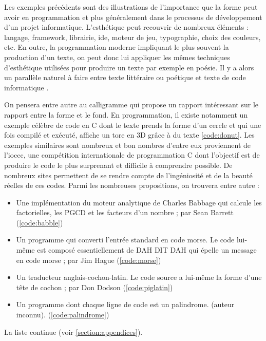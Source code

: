 \documentclass[12pt]{article} %
\begin{document}
Les exemples précédents sont des illustrations de l'importance que la forme peut avoir en programmation et plus généralement dans le processus de développement d'un projet informatique. L'esthétique peut recouvrir de nombreux éléments : langage, framework, librairie, \acrshort{ide}, moteur de jeu, typographie, choix des couleurs, etc. En outre, la programmation moderne impliquant le plus souvent la production d'un texte, on peut donc lui appliquer les mêmes techniques d'esthétique utilisées pour produire un texte par exemple en poésie. Il y a alors un parallèle naturel à faire entre texte littéraire ou poétique et texte de code informatique \cite{FCramer2001}.

On pensera entre autre au \gls{calligramme} qui propose un rapport intéressant sur le rapport entre la forme et le fond. En programmation, il existe notamment un exemple célèbre de code en C dont le texte prends la forme d'un cercle et qui une fois compilé et exécuté, affiche un tore en 3D grâce à du texte \autoref{code:donut}. Les exemples similaires sont nombreux et bon nombres d'entre eux proviennent de l'\acrshort{ioccc}, une compétition internationale de programmation C dont l'objectif est de produire le code le plus surprenant et difficile à comprendre possible. De nombreux sites permettent de se rendre compte de l'ingéniosité et de la beauté réelles de ces codes. Parmi les nombreuses propositions, on trouvera entre autre :
\begin{itemize}\label{exemples-ioccc}
    \item Une implémentation du moteur analytique de Charles Babbage qui calcule les factorielles, les PGCD et les facteurs d'un nombre ; par Sean Barrett \cite{SBarrett-Babble} (\ref{code:babble})
    \item Un programme qui converti l'entrée standard en code morse. Le code lui-même est composé essentiellement de DAH DIT DAH qui épelle un message en code morse ; par Jim Hague \cite{JHague-morse} (\ref{code:morse})
    \item Un traducteur anglais-cochon-latin. Le code source a lui-même la forme d'une tête de cochon ; par Don Dodson \cite{DDodson-piglatin} (\ref{code:piglatin})
    \item Un programme dont chaque ligne de code est un \gls{palindrome}. (auteur inconnu). (\ref{code:palindrome})
\end{itemize}
La liste continue (voir \ref{section:appendices}). 
\end{document}
